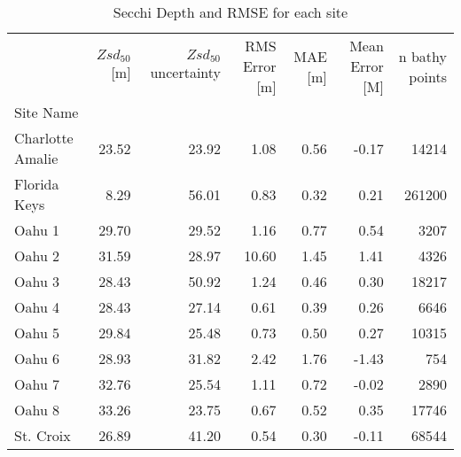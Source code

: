 \begin{table}
\centering
\caption{Secchi Depth and RMSE for each site}
\label{tab:ocean_color_summary_by_site}
\begin{tabular}{lrrrrrr}
\toprule
{} &  $Zsd_{50}$[m] &  $Zsd_{50}$ uncertainty &  RMS Error [m] &  MAE [m] &  Mean Error [M] &  n bathy points \\
Site Name        &                &                         &                &          &                 &                 \\
\midrule
Charlotte Amalie &          23.52 &                   23.92 &           1.08 &     0.56 &           -0.17 &           14214 \\
Florida Keys     &           8.29 &                   56.01 &           0.83 &     0.32 &            0.21 &          261200 \\
Oahu 1           &          29.70 &                   29.52 &           1.16 &     0.77 &            0.54 &            3207 \\
Oahu 2           &          31.59 &                   28.97 &          10.60 &     1.45 &            1.41 &            4326 \\
Oahu 3           &          28.43 &                   50.92 &           1.24 &     0.46 &            0.30 &           18217 \\
Oahu 4           &          28.43 &                   27.14 &           0.61 &     0.39 &            0.26 &            6646 \\
Oahu 5           &          29.84 &                   25.48 &           0.73 &     0.50 &            0.27 &           10315 \\
Oahu 6           &          28.93 &                   31.82 &           2.42 &     1.76 &           -1.43 &             754 \\
Oahu 7           &          32.76 &                   25.54 &           1.11 &     0.72 &           -0.02 &            2890 \\
Oahu 8           &          33.26 &                   23.75 &           0.67 &     0.52 &            0.35 &           17746 \\
St. Croix        &          26.89 &                   41.20 &           0.54 &     0.30 &           -0.11 &           68544 \\
\bottomrule
\end{tabular}
\end{table}
